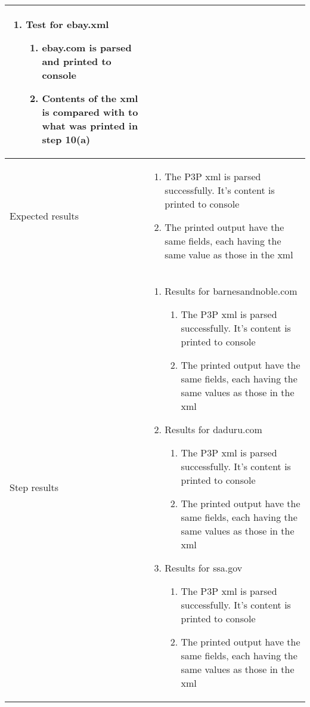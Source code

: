 \begin{center}
\begin{longtable}{ | p{4cm} | p{10cm} | }
\begin{enumerate}
							\item Test for ebay.xml
							\begin{enumerate}
								\item ebay.com is parsed and printed to console
								\item Contents of the xml is compared with to what was printed in step 10(a)
							\end{enumerate}
						\end{enumerate} \\ [3pt] \hline
			
			Expected results &	\begin{enumerate}
							\item The P3P xml is parsed successfully. It's content is printed to console
							\item The printed output have the same fields, each having the same value as those in the xml
						\end{enumerate}
							 \\  [3pt] \hline

			Step results & 	\begin{enumerate}
							\item Results for barnesandnoble.com
							\begin{enumerate}
								\item The P3P xml is parsed successfully. It's content is printed to console
								\item The printed output have the same fields, each having the same values as those in the xml
							\end{enumerate}

							\item Results for daduru.com
							\begin{enumerate}
								\item The P3P xml is parsed successfully. It's content is printed to console
								\item The printed output have the same fields, each having the same values as those in the xml
							\end{enumerate}

							\item Results for ssa.gov
							\begin{enumerate}
								\item The P3P xml is parsed successfully. It's content is printed to console
								\item The printed output have the same fields, each having the same values as those in the xml
							\end{enumerate}


\end{enumerate}
\end{longtable}
\end{center}
